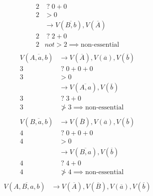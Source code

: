 \documentclass{article}
\newcommand*{\unknown}[0]{\;?\;}
\begin{document}
\begin{enumerate}
\begin{enumerate}
\begin{align*}
    2                     &\unknown    0              + 0                  \\
    2                     &>           0                                   \\
                          &\rightarrow V(\overline{B, b}), V(\overline{A}) \\
    2                     &\unknown    2              + 0                  \\
    2                     &not>        2                                   \implies \text{non-essential} \\
    \end{align*}
    \begin{align*}
    V(\overline{A, a, b}) &\rightarrow V(\overline{A}), V(\overline{a}), V(\overline{b}) \\
    3                     &\unknown    0              + 0              + 0 \\
    3                     &>           0                                   \\
                          &\rightarrow V(\overline{A, a}), V(\overline{b}) \\
    3                     &\unknown    3              + 0                  \\
    3                     &\not>       3                                   \implies \text{non-essential} \\
    \end{align*}
    \begin{align*}
    V(\overline{B, a, b}) &\rightarrow V(\overline{B}), V(\overline{a}), V(\overline{b}) \\
    4                     &\unknown    0              + 0              + 0 \\
    4                     &>           0                                   \\
                          &\rightarrow V(\overline{B, a}), V(\overline{b}) \\
    4                     &\unknown    4              + 0                  \\
    4                     &\not>       4                                   \implies \text{non-essential} \\
    \end{align*}
    \begin{align*}
    V(\overline{A, B, a, b}) &\rightarrow V(\overline{A}), V(\overline{B}), V(\overline{a}), V(\overline{b}) \\

\end{align*}
\end{enumerate}
\end{enumerate}
\end{document}
